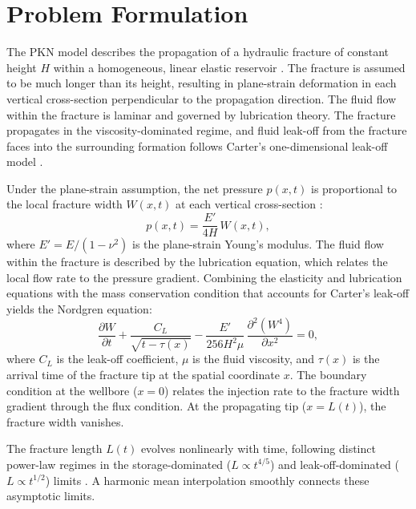 \documentclass{ws-ijcm}
\begin{document}
\section{Problem Formulation}

The PKN model describes the propagation of a hydraulic fracture of
constant height $H$ within a homogeneous, linear elastic reservoir
\cite{Nordgren1972}. The fracture is assumed to be much longer than
its height, resulting in plane-strain deformation in each vertical
cross-section perpendicular to the propagation direction. The fluid
flow within the fracture is laminar and governed by lubrication
theory. The fracture propagates in the viscosity-dominated regime,
and fluid leak-off from the fracture faces into the surrounding
formation follows Carter's one-dimensional leak-off model
\cite{Detournay2016}.

Under the plane-strain assumption, the net pressure $p(x,t)$ is
proportional to the local fracture width $W(x,t)$ at each vertical
cross-section \cite{Nordgren1972}:
\begin{equation}
  p(x,t) = \frac{E'}{4H}\,W(x,t),
  \label{eq:elasticity}
\end{equation}
where $E' = E/(1-\nu^2)$ is the plane-strain Young's modulus. The
fluid flow within the fracture is described by the lubrication
equation, which relates the local flow rate to the pressure gradient.
Combining the elasticity and lubrication equations with the mass
conservation condition that accounts for Carter's leak-off yields the
Nordgren equation:
\begin{equation}
  \frac{\partial W}{\partial t} + \frac{C_L}{\sqrt{t - \tau(x)}}
  - \frac{E'}{256 H^2\mu}\,\frac{\partial^2(W^4)}{\partial x^2}
  = 0,
  \label{eq:nordgren}
\end{equation}
where $C_L$ is the leak-off coefficient, $\mu$ is the fluid viscosity,
and $\tau(x)$ is the arrival time of the fracture tip at the spatial
coordinate $x$. The boundary condition at the wellbore ($x = 0$)
relates the injection rate to the fracture width gradient through the
flux condition. At the propagating tip ($x = L(t)$), the fracture width
vanishes.

The fracture length $L(t)$ evolves nonlinearly with time, following
distinct power-law regimes in the storage-dominated ($L \propto
t^{4/5}$) and leak-off-dominated ($L \propto t^{1/2}$) limits
\cite{Nordgren1972}. A harmonic mean interpolation smoothly connects
these asymptotic limits.
\end{document}
